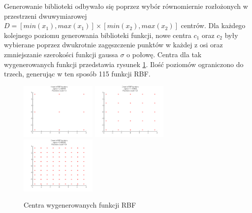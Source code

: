 Generowanie biblioteki odbywało się poprzez wybór równomiernie rozłożonych w przestrzeni dwuwymiarowej $D = [min(x_1),max(x_1)] \times [min(x_2),max(x_2)]$ centrów. Dla każdego kolejnego poziomu generowania biblioteki funkcji, nowe centra $c_1$ oraz $c_2$ były wybierane poprzez dwukrotnie zagęszczenie punktów w każdej z osi oraz zmniejszanie szerokości funkcji gaussa $\sigma$ o połowę. Centra dla tak wygenerowanych funkcji przedstawia rysunek \ref{img:rbf_centers}. Ilość poziomów ograniczono do trzech, generując w ten sposób 115 funkcji RBF.

\begin{figure}[ht!]
	\centering	
	
	\subfloat
	{\includegraphics[width=0.33\textwidth]
	{images/centers1.png}}
	\subfloat
	{\includegraphics[width=0.33\textwidth]
	{images/centers2.png}}
	\subfloat
	{\includegraphics[width=0.33\textwidth]
	{images/centers3.png}}

	\caption{Centra wygenerowanych funkcji RBF}
	\label{img:rbf_centers}
\end{figure}

